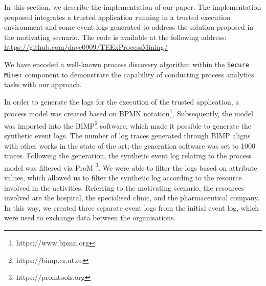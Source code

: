 In this section, we describe the implementation of our paper. The implementation proposed integrates a trusted application running in a
trusted execution environment and some event logs generated to address the solution proposed in the motivating scenario. The code is available at the following address: \url{https://github.com/dave0909/TEExProcessMining/}

We have encoded a well-known process discovery algorithm within the \texttt{Secure Miner} component to demonstrate the capability of conducting process analytics tasks with our approach.

In order to generate the logs for the execution of the trusted application, a process model was created based on BPMN notation\footnote{https://www.bpmn.org}. Subsequently, the model was imported into the BIMP\footnote{https://bimp.cs.ut.ee} software, which made it possible to generate the synthetic event logs. The number of log traces generated through BIMP aligns with other works in the state of the art; the generation software was set to 1000 traces. Following the generation, the synthetic event log relating to the process model was filtered via ProM \footnote{https://promtools.org}. We were able to filter the logs based on attribute values, which allowed us to filter the synthetic log according to the resource involved in the activities. Referring to the motivating scenario, the resources involved are the hospital, the specialised clinic, and the pharmaceutical company. In this way, we created three separate event logs from the initial event log, which were used to exchange data between the organisations.

